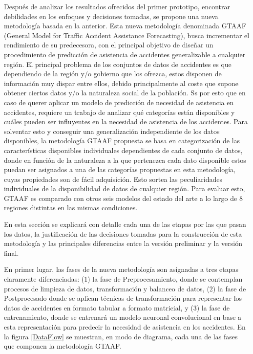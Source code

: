 \documentclass{uathesis-es}
\begin{document}
Después de analizar los resultados ofrecidos del primer prototipo, encontrar debilidades en los enfoques y decisiones tomadas, se propone una nueva metodología basada en la anterior. Esta nueva metodología denominada GTAAF (General Model for Traffic Accident Assistance Forecasting), busca incrementar el rendimiento de su predecesora, con el principal objetivo de diseñar un procedimiento de predicción de asistencia de accidentes generalizable a cualquier región. El principal problema de los conjuntos de datos de accidentes es que dependiendo de la región y/o gobierno que los ofrezca, estos disponen de información muy dispar entre ellos, debido principalmente al coste que supone obtener ciertos datos y/o la naturaleza social de la población. Ss por esto que en caso de querer aplicar un modelo de predicción de necesidad de asistencia en accidentes, requiere un trabajo de analizar qué categorías están disponibles y cuáles pueden ser influyentes en la necesidad de asistencia de los accidentes. Para solventar esto y conseguir una generalización independiente de los datos disponibles, la metodología GTAAF propuesta se basa en categorización de las características disponibles individuales dependientes de cada conjunto de datos, donde en función de la naturaleza a la que pertenezca cada dato disponible estos puedan ser asignados a una de las categorías propuestas en esta metodología, cuyas propiedades son de fácil adquisición. Esto sortea las peculiaridades individuales de la disponibilidad de datos de cualquier región. Para evaluar esto, GTAAF es comparado con otros seis modelos del estado del arte a lo largo de 8 regiones distintas en las mismas condiciones.

En esta sección se explicará con detalle cada una de las etapas por las que pasan los datos, la justificación de las decisiones tomadas para la construcción de esta metodología y las principales diferencias entre la versión preliminar y la versión final.

En primer lugar, las fases de la nueva metodología son asignadas a tres etapas claramente diferenciadas: (1) la fase de Preprocesamiento, donde se contemplan procesos de limpieza de datos, transformación y balanceo de datos, (2) la fase de Postprocesado donde se aplican técnicas de transformación para representar los datos de accidentes en formato tabular a formato matricial, y (3) la fase de entrenamiento, donde se entrenará un modelo neuronal convolucional en base a esta representación para predecir la necesidad de asistencia en los accidentes. En la figura \ref{DataFlow} se muestran, en modo de diagrama, cada una de las fases que componen la metodología GTAAF.
\end{document}
